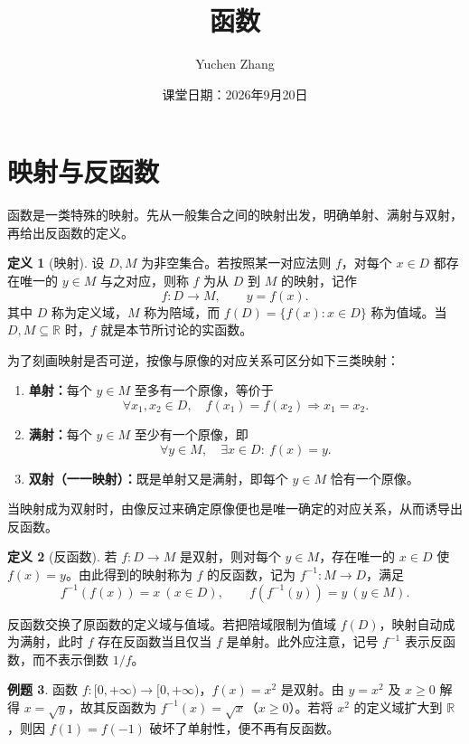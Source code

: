 \documentclass[UTF8, fontset=fandol, a4paper, 12pt]{ctexart}
\title{函数}
\author{Yuchen Zhang}
\date{课堂日期：2026年9月20日}
\makeatletter
\newcommand{\R}{\mathbb R}
\theoremstyle{definition}
\newtheorem{definition}{定义}[section]
\newtheorem{example}[definition]{例题}
\renewcommand{\maketitle}{\begin{center}
{\LARGE\bfseries \@title\par}\vspace{0.6em}
\@author\par\vspace{0.2em}{\small\@date\par}
\end{center}}
\makeatother
\begin{document}
\maketitle
\section{映射与反函数}
函数是一类特殊的映射。先从一般集合之间的映射出发，明确单射、满射与双射，再给出反函数的定义。

\begin{definition}[映射]
设 $D,M$ 为非空集合。若按照某一对应法则 $f$，对每个 $x\in D$ 都存在唯一的 $y\in M$ 与之对应，则称 $f$ 为从 $D$ 到 $M$ 的映射，记作
\[
 f:D\to M,\qquad y=f(x).
\]
其中 $D$ 称为定义域，$M$ 称为陪域，而 $f(D)=\{f(x):x\in D\}$ 称为值域。当 $D,M\subseteq\R$ 时，$f$ 就是本节所讨论的实函数。
\end{definition}

为了刻画映射是否可逆，按像与原像的对应关系可区分如下三类映射：
\begin{enumerate}
\item \textbf{单射：}每个 $y\in M$ 至多有一个原像，等价于
\[
 \forall x_1,x_2\in D,\quad f(x_1)=f(x_2)\Longrightarrow x_1=x_2.
\]
\item \textbf{满射：}每个 $y\in M$ 至少有一个原像，即
\[
 \forall y\in M,\quad\exists x\in D:\ f(x)=y.
\]
\item \textbf{双射（一一映射）：}既是单射又是满射，即每个 $y\in M$ 恰有一个原像。
\end{enumerate}

当映射成为双射时，由像反过来确定原像便也是唯一确定的对应关系，从而诱导出反函数。

\begin{definition}[反函数]
若 $f:D\to M$ 是双射，则对每个 $y\in M$，存在唯一的 $x\in D$ 使 $f(x)=y$。由此得到的映射称为 $f$ 的反函数，记为 $f^{-1}:M\to D$，满足
\[
 f^{-1}(f(x))=x\ (x\in D),\qquad f(f^{-1}(y))=y\ (y\in M).
\]
\end{definition}

反函数交换了原函数的定义域与值域。若把陪域限制为值域 $f(D)$，映射自动成为满射，此时 $f$ 存在反函数当且仅当 $f$ 是单射。此外应注意，记号 $f^{-1}$ 表示反函数，而不表示倒数 $1/f$。

\begin{example}
函数 $f:[0,+\infty)\to[0,+\infty)$，$f(x)=x^2$ 是双射。由 $y=x^2$ 及 $x\ge0$ 解得 $x=\sqrt y$，故其反函数为 $f^{-1}(x)=\sqrt x$（$x\ge0$）。若将 $x^2$ 的定义域扩大到 $\R$，则因 $f(1)=f(-1)$ 破坏了单射性，便不再有反函数。
\end{example}
\end{document}
